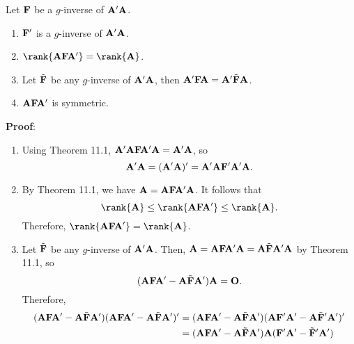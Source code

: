 \begin{Theorem}{}{}
    Let $ \mathbf{F} $ be a $ g $-inverse of $ \mathbf{A}'\mathbf{A} $.
    \begin{enumerate}[(1)]
        \item $ \mathbf{F}' $ is a $ g $-inverse of $ \mathbf{A}'\mathbf{A} $.
        \item $ \rank{\Matrix{A}\Matrix{F}\Matrix{A}'}=\rank{\Matrix{A}} $.
        \item Let $ \tilde{\mathbf{F}} $ be any $ g $-inverse of $ \mathbf{A}'\mathbf{A} $,
              then
              $ \mathbf{A}'\mathbf{FA}=\mathbf{A}'\tilde{\mathbf{F}}\mathbf{A} $.
        \item $ \mathbf{A}\mathbf{F}\mathbf{A}' $ is symmetric.
    \end{enumerate}
    \tcblower{}
    \textbf{Proof}:
    \begin{enumerate}[(1)]
        \item Using Theorem 11.1, $ \mathbf{A}'\mathbf{A}\mathbf{F}\mathbf{A}'\mathbf{A}=\mathbf{A}'\mathbf{A} $, so
              \[ \mathbf{A}'\mathbf{A}=(\mathbf{A}'\mathbf{A})'=\mathbf{A}'\mathbf{A}\mathbf{F}'\mathbf{A}'\mathbf{A}. \]
        \item By Theorem 11.1, we have $ \mathbf{A}=\mathbf{A}\mathbf{F}\mathbf{A}'\mathbf{A} $. It follows that
              \[ \rank{\Matrix{A}}\le \rank{\Matrix{A}\Matrix{F}\Matrix{A}'}\le \rank{\Matrix{A}}. \]
              Therefore, $ \rank{\Matrix{AFA}'}=\rank{\Matrix{A}} $.
        \item Let $ \tilde{\mathbf{F}} $  be any $ g $-inverse of $ \mathbf{A}'\mathbf{A} $. Then,
              $ \mathbf{A}=\mathbf{A}\mathbf{F}\mathbf{A}'\mathbf{A}=\mathbf{A}\tilde{\mathbf{F}}\mathbf{A}'\mathbf{A} $ by Theorem 11.1, so
              \[ (\mathbf{A}\mathbf{F}\mathbf{A}'-\mathbf{A}\tilde{\mathbf{F}}\mathbf{A}')\mathbf{A}=\mathbf{O}. \]
              Therefore,
              \begin{align*}
                  (\Matrix{A}\Matrix{F}\Matrix{A}'-\Matrix{A}\tilde{\Matrix{F}}\Matrix{A}')(\Matrix{A}\Matrix{F}\Matrix{A}'-\Matrix{A}\tilde{\Matrix{F}}\Matrix{A}')'
                   & =(\Matrix{A}\Matrix{F}\Matrix{A}'-\Matrix{A}\tilde{\Matrix{F}}\Matrix{A}')(\Matrix{A}\Matrix{F}'\Matrix{A}'-\Matrix{A}\tilde{\Matrix{F}}'\Matrix{A}')'                                                    \\
                   & =(\Matrix{A}\Matrix{F}\Matrix{A}'-\Matrix{A}\tilde{\Matrix{F}}\Matrix{A}')\Matrix{A}(\Matrix{F}'\Matrix{A}'-\tilde{\Matrix{F}}'\Matrix{A}')                                                               \\

\end{align*}
\end{enumerate}
\end{Theorem}
